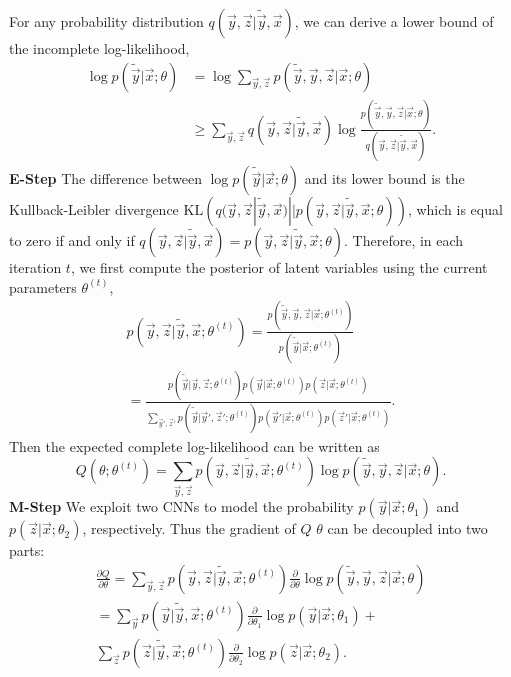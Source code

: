 For any probability distribution $q(\vec{y}, \vec{z} | \tilde{\vec{y}}, \vec{x})$, we can derive a lower bound of the incomplete log-likelihood,
\begin{equation}
\begin{aligned}
    \log p(\tilde{\vec{y}} | \vec{x}; \theta) &= \log \sum_{\vec{y},\vec{z}} p(\tilde{\vec{y}}, \vec{y}, \vec{z} | \vec{x}; \theta) \\
    &\geq \sum_{\vec{y},\vec{z}} q(\vec{y}, \vec{z} | \tilde{\vec{y}}, \vec{x}) \log \frac{p(\tilde{\vec{y}}, \vec{y}, \vec{z} | \vec{x}; \theta)}{q(\vec{y}, \vec{z} | \tilde{\vec{y}}, \vec{x})}.
\end{aligned}
\end{equation}
\textbf{E-Step} The difference between $\log p(\tilde{\vec{y}} | \vec{x}; \theta)$ and its lower bound is the Kullback-Leibler divergence $\mathrm{KL}\left(q(\vec{y}, \vec{z} | \tilde{\vec{y}}, \vec{x}) || p(\vec{y}, \vec{z} | \tilde{\vec{y}}, \vec{x}; \theta)\right)$, which is equal to zero if and only if $q(\vec{y}, \vec{z} | \tilde{\vec{y}}, \vec{x}) = p(\vec{y}, \vec{z} | \tilde{\vec{y}}, \vec{x}; \theta)$. Therefore, in each iteration $t$, we first compute the posterior of latent variables using the current parameters $\theta^{(t)}$,
\begin{multline} \label{eq:nl-posterior}
    p(\vec{y}, \vec{z} | \tilde{\vec{y}}, \vec{x}; \theta^{(t)}) = \frac{p(\tilde{\vec{y}}, \vec{y}, \vec{z} | \vec{x}; \theta^{(t)})}{p(\tilde{\vec{y}} | \vec{x}; \theta^{(t)})} \\
    = \frac{p(\tilde{\vec{y}}|\vec{y},\vec{z};\theta^{(t)}) p(\vec{y}|\vec{x};\theta^{(t)}) p(\vec{z}|\vec{x};\theta^{(t)})}{\sum_{\vec{y}',\vec{z}'} p(\tilde{\vec{y}}|\vec{y}',\vec{z}';\theta^{(t)}) p(\vec{y}'|\vec{x};\theta^{(t)}) p(\vec{z}'|\vec{x};\theta^{(t)})}.
\end{multline}
Then the expected complete log-likelihood can be written as
\begin{equation}
    Q(\theta; \theta^{(t)}) = \sum_{\vec{y},\vec{z}} p(\vec{y}, \vec{z} | \tilde{\vec{y}}, \vec{x}; \theta^{(t)}) \log p(\tilde{\vec{y}}, \vec{y}, \vec{z} | \vec{x}; \theta).
\end{equation}
\textbf{M-Step} We exploit two CNNs to model the probability $p(\vec{y}|\vec{x};\theta_1)$ and $p(\vec{z}|\vec{x};\theta_2)$, respectively. Thus the gradient of $Q$ \wrt $\theta$ can be decoupled into two parts:
\begin{multline} \label{eq:nl-gradient}
    \frac{\partial Q}{\partial \theta} = \sum_{\vec{y},\vec{z}} p(\vec{y}, \vec{z} | \tilde{\vec{y}}, \vec{x}; \theta^{(t)}) \frac{\partial}{\partial \theta} \log p(\tilde{\vec{y}}, \vec{y}, \vec{z} | \vec{x}; \theta) \\
    = \sum_{\vec{y}} p(\vec{y} | \tilde{\vec{y}}, \vec{x}; \theta^{(t)}) \frac{\partial}{\partial \theta_1} \log p(\vec{y}|\vec{x};\theta_1) + \\
      \sum_{\vec{z}} p(\vec{z} | \tilde{\vec{y}}, \vec{x}; \theta^{(t)}) \frac{\partial}{\partial \theta_2} \log p(\vec{z}|\vec{x};\theta_2).
\end{multline}

